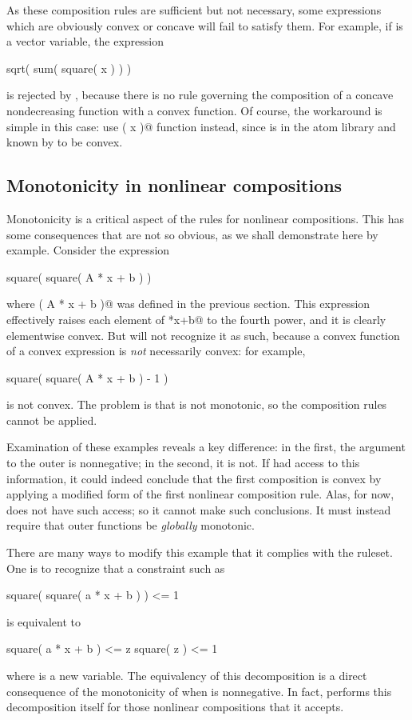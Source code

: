 \documentclass[12pt]{article}
\begin{document}
As these composition rules are sufficient but not necessary,
some expressions which are obviously convex or concave will fail to
satisfy them. For example, if \verb@x@ is a vector variable, the
expression
\begin{code}
	sqrt( sum( square( x ) ) )
\end{code}
is rejected by \cvx, because there is no rule governing the composition
of a concave nondecreasing function with a convex function.
Of course, the workaround is simple in this case: use \verb@norm( x )@ function instead,
since \verb@norm@ is in the atom library and known by \cvx to be convex.

\subsection{Monotonicity in nonlinear compositions}

Monotonicity is a critical aspect of the rules for nonlinear compositions. 
This has some consequences that are not so obvious, as we shall demonstrate here
by example. Consider the expression
\begin{code}
	square( square( A * x + b ) )
\end{code}
where \verb@square( A * x + b )@ was defined in the previous section.
This expression effectively raises each element of \verb@A*x+b@ to the fourth
power, and it is clearly elementwise convex. But
\cvx will not recognize it as such, because a convex function of a convex
expression is \emph{not} necessarily convex: for example,
\begin{code}
	square( square( A * x + b ) - 1 )
\end{code}
is not convex. The problem is that \verb@square@ is not monotonic,
so the composition rules cannot be applied.

Examination of these examples reveals a key difference:
in the first, the argument to the outer \verb@square@ is nonnegative;
in the second, it is not. If \cvx had access to this information, it could
indeed conclude that the first composition is convex by applying a
modified form of the first nonlinear composition rule.
Alas, for now, \cvx does not have such access; so it cannot make
such conclusions.
It must instead require
that outer functions be \emph{globally} monotonic.

There are many ways to modify this example that it complies with the ruleset.
One is to recognize that a constraint such as
\begin{code}
	square( square( a * x + b ) ) <= 1
\end{code}
is equivalent to
\begin{code}
	square( a * x + b ) <= z
	square( z ) <= 1
\end{code}
where \verb@z@ is a new variable. The equivalency of this decomposition
is a direct consequence of the monotonicity of 
\verb@square@ when \verb@z@
is nonnegative. In fact, \cvx performs this decomposition itself for
those nonlinear compositions that it accepts.
\end{document}
